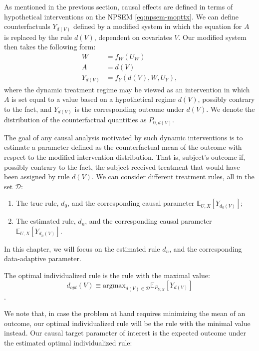 \documentclass[12pt, krantz2,]{book}
\theoremstyle{definition}
\theoremstyle{definition}
\theoremstyle{definition}
\newcommand{\E}{\mathbb{E}}
\newcommand{\1}{\mathbbm{1}}
\begin{document}
As mentioned in the previous section, causal effects are defined in terms of
hypothetical interventions on the NPSEM \eqref{eq:npsem-mopttx}. We can define
counterfactuals \(Y_{d(V)}\) defined by a modified system in which the equation
for \(A\) is replaced by the rule \(d(V)\), dependent on covariates \(V\). Our
modified system then takes the following form:
\begin{align}
  W &= f_W(U_W) \\ A &= d(V) \\ Y_{d(V)} &= f_Y(d(V), W, U_Y),
  \label{eq:npsem-causal-mopttx}
\end{align}
where the dynamic treatment regime may be viewed as an intervention in which \(A\)
is set equal to a value based on a hypothetical regime \(d(V)\), possibly contrary
to the fact, and \(Y_{d(V)}\) is the corresponding outcome under \(d(V)\). We
denote the distribution of the counterfactual quantities as \(P_{0,d(V)}\).

The goal of any causal analysis motivated by such dynamic interventions is to
estimate a parameter defined as the counterfactual mean of the outcome with
respect to the modified intervention distribution. That is, subject's outcome
if, possibly contrary to the fact, the subject received treatment that would
have been assigned by rule \(d(V)\). We can consider different treatment rules,
all in the set \(\mathcal{D}\):

\begin{enumerate}
\def\labelenumi{\arabic{enumi}.}
\item
  The true rule, \(d_0\), and the corresponding causal parameter
  \(\E_{U,X}[Y_{d_0(V)}]\);
\item
  The estimated rule, \(d_n\), and the corresponding causal parameter
  \(\E_{U,X}[Y_{d_n(V)}]\).
\end{enumerate}

In this chapter, we will focus on the estimated rule \(d_n\), and the
corresponding data-adaptive parameter.

The optimal individualized rule is the rule with the maximal value:
\[d_{opt}(V) \equiv \text{argmax}_{d(V) \in \mathcal{D}}
\E_{P_{U,X}}[Y_{d(V)}]\].

We note that, in case the problem at hand requires minimizing the mean of an
outcome, our optimal individualized rule will be the rule with the minimal value
instead. Our causal target parameter of interest is the expected outcome under
the estimated optimal individualized rule:
\end{document}
